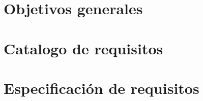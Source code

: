 \section{Objetivos generales}

\section{Catalogo de requisitos}

\section{Especificación de requisitos}


